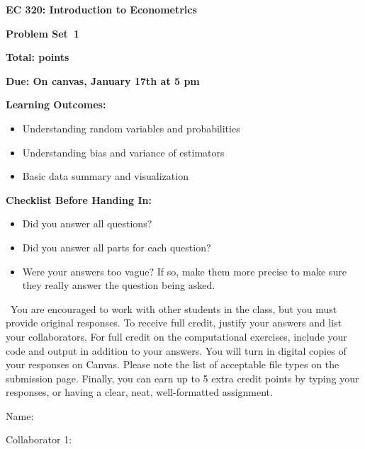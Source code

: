 \documentclass[11pt]{article}
\begin{document}
\begin{onehalfspacing}

\begin{center}
\textbf{EC 320: Introduction to Econometrics} \bigskip

\textbf{Problem Set\bigskip\ 1}
\bigskip
\end{center}


\noindent \textbf{Total:  points}

\noindent \textbf{Due: On canvas, January 17th at 5 pm}

\bigskip

\noindent \textbf{Learning Outcomes:}
\begin{itemize}
\item Understanding random variables and probabilities  
\item Understanding bias and variance of estimators 
\item Basic data summary and visualization
\end{itemize}

\bigskip


\noindent \textbf{Checklist Before Handing In:}
\begin{itemize}
\item Did you answer all questions?
\item Did you answer all parts for each question?
\item Were your answers too vague? If so, make them more precise to make sure they really answer the question being asked.
\end{itemize}

\bigskip

\ You are encouraged to work with other students in the class, but you must provide original responses. To receive full credit, justify your answers and list your collaborators. For full credit on the computational exercises, include your code and output in addition to your answers. You will turn in digital copies of your responses on Canvas. Please note the list of acceptable file types on the submission page. Finally, you can earn up to 5 extra credit points by typing your responses, or having a clear, neat, well-formatted assignment. \\
\vspace{0.1in}

Name: 			\\
\vspace{0.1in}

Collaborator 1: \\


\end{onehalfspacing}
\end{document}

